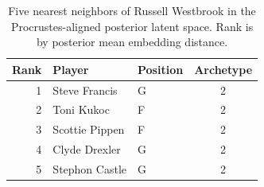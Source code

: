 \begin{table}[htbp]
  \centering\small
  \begin{tabular}{rllc}
    \toprule
    Rank & Player & Position & Archetype \\
    \midrule
    1 & Steve Francis & G & 2 \\
    2 & Toni Kukoc & F & 2 \\
    3 & Scottie Pippen & F & 2 \\
    4 & Clyde Drexler & G & 2 \\
    5 & Stephon Castle & G & 2 \\
    \bottomrule
  \end{tabular}
  \caption{Five nearest neighbors of Russell Westbrook in the Procrustes-aligned posterior latent space. Rank is by posterior mean embedding distance.}
  \label{tab:Russell_Westbrook_neighbors}
\end{table}

